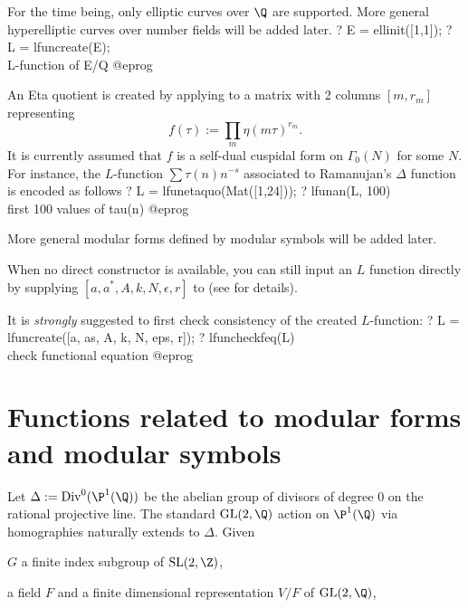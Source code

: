 
For the time being, only elliptic curves over $\Q$ are supported. More
general hyperelliptic curves over number fields will be added later.
\bprog
? E = ellinit([1,1]);
? L = lfuncreate(E);  \\ L-function of E/Q
@eprog


An Eta quotient is created by applying  to a matrix with
2 columns $[m, r_m]$ representing
$$ f(\tau) := \prod_m \eta(m\tau)^{r_m}. $$
It is currently assumed that $f$ is a self-dual cuspidal form on
$\Gamma_0(N)$ for some $N$.
For instance, the $L$-function $\sum \tau(n) n^{-s}$
associated to Ramanujan's $\Delta$ function is encoded as follows
\bprog
? L = lfunetaquo(Mat([1,24]));
? lfunan(L, 100)  \\ first 100 values of tau(n)
@eprog

More general modular forms defined by modular symbols will be added later.


When no direct constructor is available, you can still input an $L$ function
directly by supplying $[a, a^*,A, k, N, \epsilon, r]$ to 
(see  for details).

It is \emph{strongly} suggested to first check consistency of the created
$L$-function:
\bprog
? L = lfuncreate([a, as, A, k, N, eps, r]);
? lfuncheckfeq(L)  \\ check functional equation
@eprog


\section{Functions related to modular forms and modular symbols}

Let $\Delta := \text{Div}^0(\P^1(\Q))$ be the abelian group of divisors of
degree $0$ on the rational projective line. The standard $\text{GL}(2,\Q)$
action on $\P^1(\Q)$ via homographies naturally extends to $\Delta$. Given

\item $G$ a finite index subgroup of $\text{SL}(2,\Z)$,

\item a field $F$ and a finite dimensional representation $V/F$ of
  $\text{GL}(2,\Q)$,

